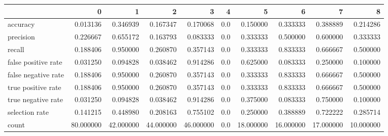 \begin{tabular}{lrrrrrrrrr}
\toprule
{} &          0 &          1 &          2 &          3 &    4 &          5 &          6 &          7 &          8 \\
\midrule
accuracy            &   0.013136 &   0.346939 &   0.167347 &   0.170068 &  0.0 &   0.150000 &   0.333333 &   0.388889 &   0.214286 \\
precision           &   0.226667 &   0.655172 &   0.163793 &   0.083333 &  0.0 &   0.333333 &   0.500000 &   0.600000 &   0.333333 \\
recall              &   0.188406 &   0.950000 &   0.260870 &   0.357143 &  0.0 &   0.333333 &   0.833333 &   0.666667 &   0.500000 \\
false positive rate &   0.031250 &   0.094828 &   0.038462 &   0.914286 &  0.0 &   0.625000 &   0.083333 &   0.250000 &   0.100000 \\
false negative rate &   0.188406 &   0.950000 &   0.260870 &   0.357143 &  0.0 &   0.333333 &   0.833333 &   0.666667 &   0.500000 \\
true positive rate  &   0.188406 &   0.950000 &   0.260870 &   0.357143 &  0.0 &   0.333333 &   0.833333 &   0.666667 &   0.500000 \\
true negative rate  &   0.031250 &   0.094828 &   0.038462 &   0.914286 &  0.0 &   0.375000 &   0.083333 &   0.750000 &   0.100000 \\
selection rate      &   0.141215 &   0.448980 &   0.208163 &   0.755102 &  0.0 &   0.250000 &   0.388889 &   0.722222 &   0.285714 \\
count               &  80.000000 &  42.000000 &  44.000000 &  46.000000 &  0.0 &  18.000000 &  16.000000 &  17.000000 &  10.000000 \\
\bottomrule
\end{tabular}
